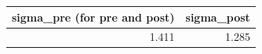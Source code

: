 \begin{tabular}{rr}
\toprule
sigma\_pre (for pre and post) & sigma\_post \\
\midrule
1.411 & 1.285 \\
\bottomrule
\end{tabular}
